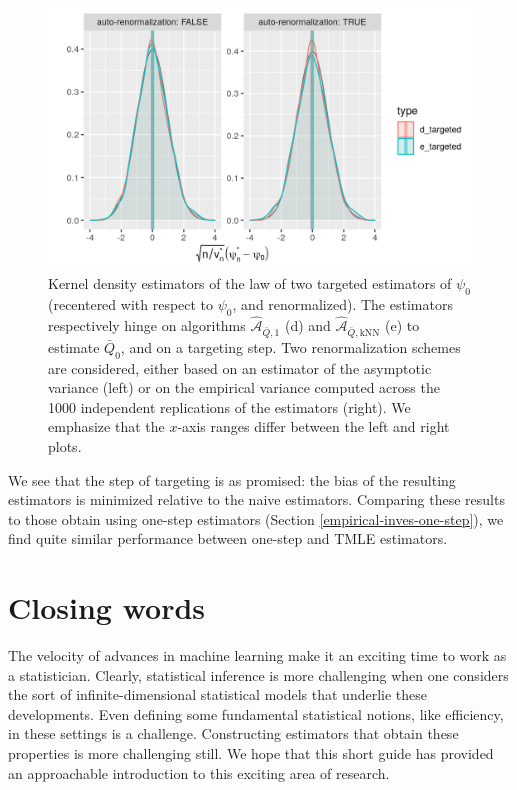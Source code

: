 \documentclass[
  11pt,
  openright,twoside]{book}
\newcommand{\Algo}{\widehat{\mathcal{A}}}
\newcommand{\Qbar}{\bar{Q}}
\theoremstyle{definition}
\theoremstyle{definition}
\theoremstyle{definition}
\theoremstyle{definition}
\theoremstyle{remark}
\begin{document}
\begin{figure}

{\centering \includegraphics[width=0.7\linewidth]{img/tmle-1} 

}

\caption{Kernel density estimators of the law of two targeted estimators of \(\psi_{0}\) (recentered with respect to \(\psi_{0}\), and renormalized). The estimators respectively hinge on algorithms \(\Algo_{\Qbar,1}\) (d) and \(\Algo_{\Qbar,\text{kNN}}\) (e) to estimate \(\Qbar_{0}\), and on a targeting step. Two renormalization schemes are considered, either based on an estimator of the asymptotic variance (left) or on the empirical variance computed across the 1000 independent replications of the estimators (right). We emphasize that the \(x\)-axis ranges differ between the left and right plots.}\label{fig:tmle}
\end{figure}

We see that the step of targeting is as promised: the bias of the resulting
estimators is minimized relative to the naive estimators. Comparing
these results to those obtain using one-step estimators (Section
\ref{empirical-inves-one-step}), we find quite similar performance between
one-step and TMLE estimators.

\hypertarget{closing-words}{%
\chapter{Closing words}\label{closing-words}}

The velocity of advances in machine learning make it an exciting time to work as
a statistician. Clearly, statistical inference is more challenging when one
considers the sort of infinite-dimensional statistical models that underlie
these developments. Even defining some fundamental statistical notions, like
efficiency, in these settings is a challenge. Constructing estimators that
obtain these properties is more challenging still. We hope that this short guide
has provided an approachable introduction to this exciting area of research.
\end{document}
